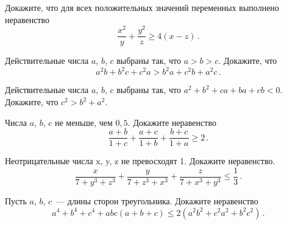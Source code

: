 


\begin{problems}

\item
Докажите, что для всех положительных значений переменных выполнено неравенство
\[
    \frac{x^2}{y} + \frac{y^2}{z} \geq 4 (x - z)
\, . \]

\item
Действительные числа $a$, $b$, $c$ выбраны так, что $a > b > c$.
Докажите, что
\[
    a^2 b + b^2 c + c^2 a > b^2 a + c^2 b + a^2 c
\, . \]

\item
Действительные числа $a$, $b$, $c$ выбраны так, что
$a^2 + b^2 + c a + b a + c b < 0$.
Докажите, что $c^2 > b^2 + a^2$.

\item
Числа $a$, $b$, $c$ не меньше, чем $0{,}5$.
Докажите неравенство
\[
    \frac{a + b}{1 + c} + \frac{a + c}{1 + b} + \frac{b + c}{1 + a} \geq 2
\, . \]

\item
Неотрицательные числа x, y, z не превосходят 1. Докажите неравенство.
\[
    \frac{x}{7 + y^3 + z^3} + \frac{y}{7 + z^3 + x^3} + \frac{z}{7 + x^3 + y^3}
\leq
    \frac{1}{3}
\, . \]

\item
Пусть $a$, $b$, $c$~--- длины сторон треугольника.
Докажите неравенство
\[
    a^4 + b^4 + c^4 + a b c (a + b + c)
\leq
    2 (a^2 b^2 + c^2 a^2 + b^2 c^2)
\, . \]

\end{problems}


